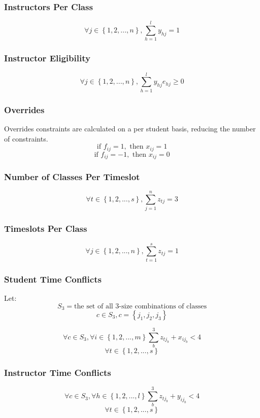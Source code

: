 \documentclass[11pt]{article}
\begin{document}
\subsubsection{Instructors Per Class}
\[\forall j \in \left\{ {1,2,...,n}\right\}, \sum_{h=1}^{l}y_{hj} = 1\]
\subsubsection{Instructor Eligibility}
\[\forall j \in \left\{ {1,2,...,n}\right\}, \sum_{h=1}^{l}y_{hj}e_{hj} \geq 0\]
\subsubsection{Overrides}\Large
\indent Overrides constraints are calculated on a per student basis, reducing the number of constraints.
\Huge
\[ \text{if } f_{ij} = 1, \text{ then } x_{ij} = 1\]
\[ \text{if } f_{ij} = -1, \text{ then } x_{ij} = 0\]
\subsubsection{Number of Classes Per Timeslot}
\[\forall t \in \left\{ {1,2,...,s}\right\}, \sum_{j=1}^{n}z_{tj} = 3\]
\subsubsection{Timeslots Per Class}
\[\forall j \in \left\{ {1,2,...,n}\right\}, \sum_{t=1}^{s}z_{tj} = 1\]
\subsubsection{Student Time Conflicts}
\Huge
\indent Let:
\[S_3 = \text{the set of all 3-size combinations of classes}\]
\[c \in S_3, c = \left\{ {j_1, j_2, j_3}\right\}\]

\[\forall c \in S_3, \forall i \in \left\{ {1,2,...,m}\right\} \sum_{b}^{3}z_{tj_b}+x_{ij_b} < 4\]
\[\forall t \in \left\{ {1,2,...,s}\right\}\]
\subsubsection{Instructor Time Conflicts}
\[\forall c \in S_3, \forall h \in \left\{ {1,2,...,l}\right\} \sum_{b}^{3}z_{tj_b}+y_{ij_b} < 4\]
\[\forall t \in \left\{ {1,2,...,s}\right\}\]
\end{document}
